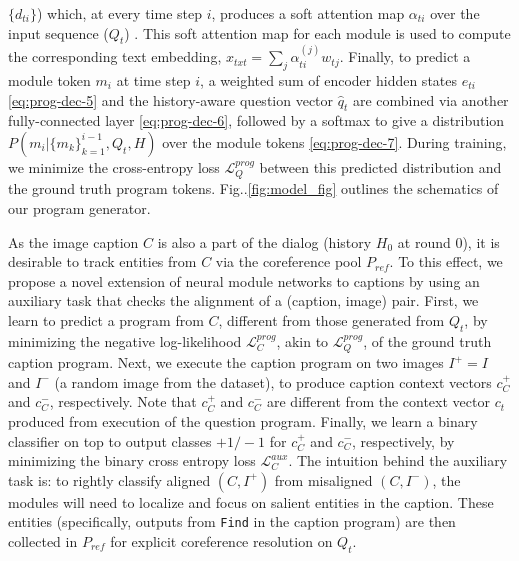 \documentclass[runningheads]{llncs}
\makeatletter
\DeclareRobustCommand\onedot{\futurelet\@let@token\@onedot}
\def\@onedot{\ifx\@let@token.\else.\null\fi\xspace}
\def\Fig{Fig\onedot}
\newcommand{\myparagraph}[1]{\vspace{0pt}\noindent{\bf #1}}
\makeatother
\begin{document}
$\{d_{ti}\}$) which, at every time step $i$,
produces a soft attention map $\alpha_{ti}$ over the input sequence ($Q_t$) 
\cite{bahdanau_iclr15}.
This soft attention map for each module is used to compute the corresponding
text embedding, $x_{txt} = \sum_{j} \alpha_{ti}^{(j)} w_{tj}$.
Finally, to predict a module token $m_i$ at time step $i$, a weighted sum
of encoder hidden states $e_{ti}$ \eqref{eq:prog-dec-5} and the history-aware 
question vector $\hat{q}_t$ are combined via another fully-connected
layer \eqref{eq:prog-dec-6}, followed by a softmax to give a distribution 
$P(m_i | \{m_k\}_{k=1}^{i-1}, Q_t, H)$ over the module tokens 
\eqref{eq:prog-dec-7}.
During training, we minimize the cross-entropy loss 
$\mathcal{L}_Q^{prog}$ between this predicted distribution and the ground truth 
program tokens.
\Fig\ref{fig:model_fig} outlines the schematics of our program generator.



\myparagraph{Modules on captions.}
As the image caption $C$ is also a part of the dialog (history $H_0$ at round $0$),
it is desirable to track entities from $C$ via the coreference pool 
$P_{ref}$.
To this effect, we propose a novel extension of neural module networks to 
captions by using an auxiliary task that checks the alignment of a (caption, 
image) pair.
First, we learn to predict a program from $C$, different from those generated 
from $Q_t$, by minimizing the negative log-likelihood $\mathcal{L}_C^{prog}$,
akin to $\mathcal{L}_Q^{prog}$, of the ground truth caption program.
Next, we execute the caption program on two images $I^+ = I$ and $I^-$ 
(a random image from the dataset), to produce caption context vectors $c_C^+$
and $c_C^-$, respectively.
Note that $c_C^+$ and $c_C^-$ are different from the context vector $c_t$ 
produced from execution of the question program.
Finally, we learn a binary classifier on top to output classes $+1/-1$ for 
$c_C^+$ and $c_C^-$, respectively, by minimizing the binary cross entropy loss 
$\mathcal{L}_C^{aux}$.
The intuition behind the auxiliary task is:
to rightly classify aligned $(C, I^+)$ from misaligned $(C, I^-)$,
the modules will need to localize and focus on salient entities in the caption.
These entities (specifically, outputs from \texttt{Find} in the caption program)
are then collected in $P_{ref}$ for explicit coreference resolution on $Q_t$.
\end{document}
